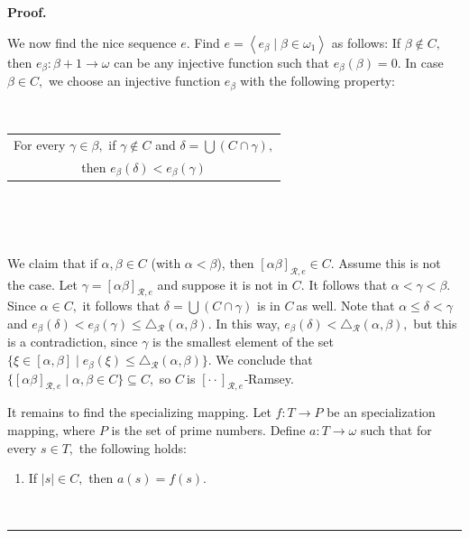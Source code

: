 \documentclass{article}
\newenvironment{proof}[1][Proof]{\noindent\textbf{#1.} }{\ \rule{0.5em}{0.5em}}
\begin{document}
\begin{proof}
\qquad\qquad\qquad

We now find the nice sequence $e.$ Find $e=\left\langle e_{\beta}\mid\beta
\in\omega_{1}\right\rangle $ as follows: If $\beta\notin C,$ then $e_{\beta
}:\beta+1\longrightarrow\omega$ can be any injective function such that
$e_{\beta}\left(  \beta\right)  =0.$ In case $\beta\in C,$ we choose an
injective function $e_{\beta}$ with the following property:

\qquad\ \qquad\ \ \ \ 

\hfill%
\begin{tabular}
[c]{|c|}\hline
For every $\gamma\in\beta,$ if $\gamma\notin C$ and $\delta=\bigcup\left(
C\cap\gamma\right)  ,$\\
then $e_{\beta}\left(  \delta\right)  <e_{\beta}\left(  \gamma\right)
$\\\hline
\end{tabular}
\hfill\ 

\qquad\ \ \ \qquad\ \ \ 

We claim that if $\alpha,\beta\in C$ (with $\alpha<\beta$), then $\left[
\alpha\beta\right]  _{\mathcal{R},e}\in C.$ Assume this is not the case. Let
$\gamma=\left[  \alpha\beta\right]  _{\mathcal{R},e}$ and suppose it is not in
$C.$ It follows that $\alpha<\gamma<\beta.$ Since $\alpha\in C,$ it follows
that $\delta=\bigcup\left(  C\cap\gamma\right)  $ is in $C\ $as well. Note
that $\alpha\leq\delta<\gamma$ and $e_{\beta}\left(  \delta\right)  <e_{\beta
}\left(  \gamma\right)  \leq\triangle_{\mathcal{R}}\left(  \alpha
,\beta\right)  $. In this way, $e_{\beta}\left(  \delta\right)  <\triangle
_{\mathcal{R}}\left(  \alpha,\beta\right)  ,$ but this is a contradiction,
since $\gamma$\textsf{ }is the smallest element of the set\textsf{
}$\{\mathsf{\xi}\in\left[  \alpha,\beta\right]  \mid e_{\beta}\left(
\xi\right)  \leq\triangle_{\mathcal{R}}\left(  \alpha,\beta\right)  \}.$ We
conclude that $\{\left[  \alpha\beta\right]  _{\mathcal{R},e}\mid\alpha
,\beta\in C\}\subseteq C,$ so $C\ $is $[\cdot\cdot]_{\mathcal{R},e}$\emph{-}Ramsey.

\qquad\qquad\qquad\qquad

It remains to find the specializing mapping. Let $f:T\longrightarrow P$ be an
specialization mapping, where $P$ is the set of prime numbers. Define
$a:T\longrightarrow\omega$ such that for every $s\in T,$ the following holds:

\begin{enumerate}
\item If $\left\vert s\right\vert \in C,$ then $a\left(  s\right)  =f\left(
s\right)  .$


\end{enumerate}
\end{proof}
\end{document}

